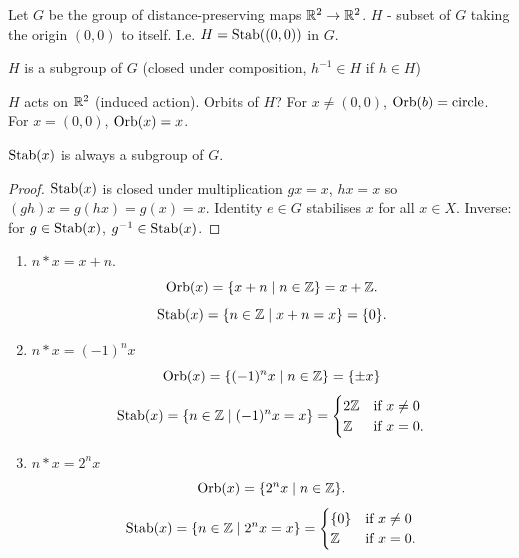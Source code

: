 \documentclass[10pt, a4paper]{article}
\begin{document}
\begin{example}
    Let $G$ be the group of distance-preserving maps $\mathbb{R} ^ 2 \to \mathbb{R} ^ 2$.
    $H$ -
    subset of $G$ taking the origin $(0, 0)$ to itself.
    I.e. $H = \operatorname{Stab}((0, 0))$ in $G$.

    $H$ is a subgroup of $G$
    (closed under composition,
    $h ^ {-1} \in H$ if $h \in H$)

    $H$ acts on $\mathbb{R} ^ 2$
    (induced action).
    Orbits of $H$?
    For $x \neq (0, 0)$,
    $\operatorname{Orb}(b) = \text{circle}$.
    For $x = (0, 0)$,
    $\operatorname{Orb}(x) = x$.
\end{example}

\begin{lemma}
    $\operatorname{Stab}(x)$ is always a subgroup of $G$.

    \begin{proof}
        $\operatorname{Stab}(x)$ is closed under multiplication $gx = x$,
        $hx = x$ so $(gh)x = g(hx) = g(x) = x$.
        Identity $e \in G$ stabilises $x$ for all $x \in X$.
        Inverse:
        for $g \in \operatorname{Stab}(x)$,
        $g ^ {-1} \in \operatorname{Stab}(x)$.
    \end{proof}
\end{lemma}

\begin{example}
    \begin{enumerate}[label = (\alph*)]
        \item $n * x = x + n$.
        \[
        \operatorname{Orb}(x) = \{x + n \mid n \in \mathbb{Z}\} = x + \mathbb{Z}.
        \]
        \[
        \operatorname{Stab}(x) = \{n \in \mathbb{Z} \mid x + n = x\} = \{0\}.
        \]

        \item $n * x = (-1) ^ nx$
        \[
        \operatorname{Orb}(x) = \{(-1) ^ nx \mid n \in \mathbb{Z}\} = \{\pm x\}
        \]
        \[
        \operatorname{Stab}(x) = \{n \in \mathbb{Z} \mid (-1) ^ nx = x\} = \begin{cases}
            2\mathbb{Z} &\text{if } x \neq 0 \\
            \mathbb{Z} &\text{if } x = 0.
        \end{cases}
        \]

        \item $n * x = 2 ^ nx$
        \[
        \operatorname{Orb}(x) = \{2 ^ nx \mid n \in \mathbb{Z}\}.
        \]
        \[
        \operatorname{Stab}(x) = \{n \in \mathbb{Z} \mid 2 ^ nx = x\} = \begin{cases}
            \{0\} &\text{if } x \neq 0 \\
            \mathbb{Z} &\text{if } x = 0.
        \end{cases}
        \]
    \end{enumerate}
\end{example}
\end{document}
